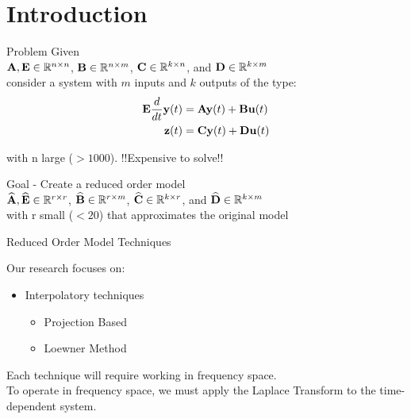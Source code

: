 \section{Introduction}

\begin{frame}{Problem}
Given\\
\bigskip
${\mathbf A}, {\bf E} \in \mathbb{R}^{n \times n}$, ${\bf B} \in \mathbb{R}^{n \times m}$, ${\bf C} \in \mathbb{R}^{k \times n}$, and ${\bf D} \in \mathbb{R}^{k \times m}$\\
\bigskip
consider a system with $m$ inputs and $k$ outputs of the type:
\begin{align*}
            {\bf E}\frac{d}{dt} {\bf y}(t)  &= {\mathbf A} {\bf y}(t) + {\bf B}{\bf u}(t)\\
            {\bf z}(t) &= {\bf C} {\bf y}(t) + {\bf D}{\bf u}(t)
\end{align*}

with n large (\(>1000\)). !!Expensive to solve!!
\bigskip

Goal - Create a reduced order model\\
\bigskip
$\widehat {{\mathbf A}}, {\bf \widehat E} \in \mathbb{R}^{r \times r}$, ${\bf \widehat B} \in \mathbb{R}^{r \times m}$, ${\bf \widehat C} \in \mathbb{R}^{k \times r}$, and ${\bf \widehat D} \in \mathbb{R}^{k \times m}$\\
\bigskip
with r small (\(<20\)) that approximates the original model


\end{frame}


\begin{frame}{Reduced Order Model Techniques}

Our research focuses on:
\bigskip
    \begin{itemize}
        \item <1-> Interpolatory techniques
        \begin{itemize}
            \item <1-> Projection Based
            \item <1-> Loewner Method
        \end{itemize}
    \end{itemize}
    \bigskip
    Each technique will require working in frequency space.\\
    \bigskip
    To operate in frequency space, we must apply the Laplace Transform to the time-dependent system.
\end{frame}